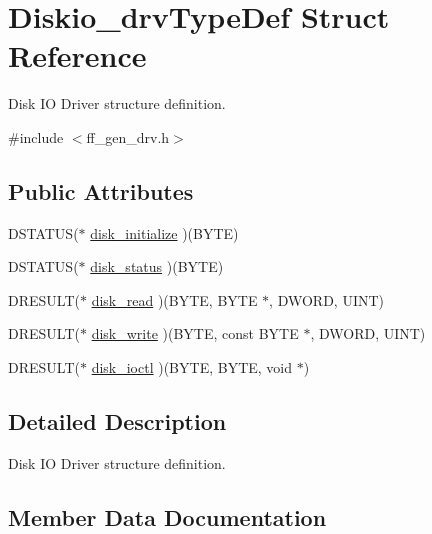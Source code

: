 \hypertarget{struct_diskio__drv_type_def}{}\section{Diskio\+\_\+drv\+Type\+Def Struct Reference}
\label{struct_diskio__drv_type_def}


Disk IO Driver structure definition.  




{\ttfamily \#include $<$ff\+\_\+gen\+\_\+drv.\+h$>$}

\subsection*{Public Attributes}
\begin{DoxyCompactItemize}
\item 
D\+S\+T\+A\+T\+US($\ast$ \mbox{\hyperlink{struct_diskio__drv_type_def_a6eb1dab68fd01043e7366dc419c693cf}{disk\+\_\+initialize}} )(B\+Y\+TE)
\item 
D\+S\+T\+A\+T\+US($\ast$ \mbox{\hyperlink{struct_diskio__drv_type_def_a6f441b818250523924b6e67cace07ed3}{disk\+\_\+status}} )(B\+Y\+TE)
\item 
D\+R\+E\+S\+U\+LT($\ast$ \mbox{\hyperlink{struct_diskio__drv_type_def_a4efc1e15fda6831ec1bf18199ea2d6fc}{disk\+\_\+read}} )(B\+Y\+TE, B\+Y\+TE $\ast$, D\+W\+O\+RD, U\+I\+NT)
\item 
D\+R\+E\+S\+U\+LT($\ast$ \mbox{\hyperlink{struct_diskio__drv_type_def_a3754d2ae169d02ba6996c4e672bff2a9}{disk\+\_\+write}} )(B\+Y\+TE, const B\+Y\+TE $\ast$, D\+W\+O\+RD, U\+I\+NT)
\item 
D\+R\+E\+S\+U\+LT($\ast$ \mbox{\hyperlink{struct_diskio__drv_type_def_aa6bcafbb089551805e88d4ee7e13d746}{disk\+\_\+ioctl}} )(B\+Y\+TE, B\+Y\+TE, void $\ast$)
\end{DoxyCompactItemize}


\subsection{Detailed Description}
Disk IO Driver structure definition. 

\subsection{Member Data Documentation}
\mbox{\label{struct_diskio__drv_type_def_a6eb1dab68fd01043e7366dc419c693cf}} 
